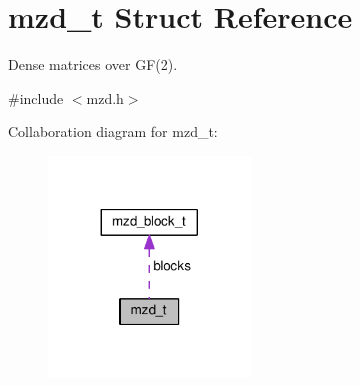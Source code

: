 \hypertarget{structmzd__t}{}\section{mzd\+\_\+t Struct Reference}
\label{structmzd__t}


Dense matrices over G\+F(2).  




{\ttfamily \#include $<$mzd.\+h$>$}



Collaboration diagram for mzd\+\_\+t\+:
\nopagebreak
\begin{figure}[H]
\begin{center}
\leavevmode
\includegraphics[width=152pt]{structmzd__t__coll__graph}
\end{center}
\end{figure}

